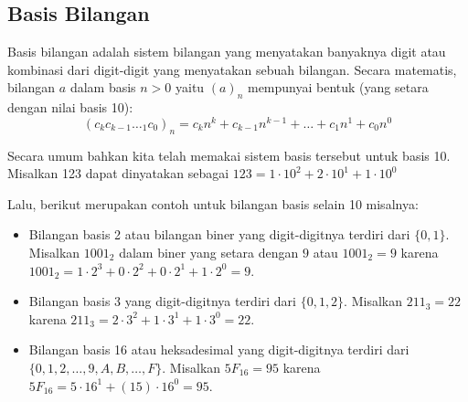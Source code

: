 \subsection{Basis Bilangan}
Basis bilangan adalah sistem bilangan yang menyatakan banyaknya digit atau kombinasi dari digit-digit yang menyatakan sebuah bilangan. Secara matematis, bilangan $a$ dalam basis $n > 0$ yaitu $(a)_n$ mempunyai bentuk (yang setara dengan nilai basis 10):
$$(c_kc_{k-1}\dotsc_1c_0)_n = c_{k}n^k + c_{k-1}n^{k-1}+\dots+c_1n^{1}+c_0n^{0}$$

Secara umum bahkan kita telah memakai sistem basis tersebut untuk basis 10. Misalkan 123 dapat dinyatakan sebagai $123 = 1\cdot 10^2 + 2\cdot 10^1 + 1\cdot 10^0$

Lalu, berikut merupakan contoh untuk bilangan basis selain 10 misalnya: 
\begin{itemize}
    \item Bilangan basis 2 atau bilangan biner yang digit-digitnya terdiri dari $\{0,1\}$. Misalkan $1001_2$ dalam biner yang setara dengan $9$ atau $1001_2 = 9$ karena $1001_2 = 1\cdot 2^3+0\cdot 2^2+0\cdot 2^1+1\cdot 2^0 = 9$. 
    \item Bilangan basis 3 yang digit-digitnya terdiri dari $\{0,1,2\}$. Misalkan $211_3 = 22$ karena $211_3 = 2\cdot 3^2+ 1\cdot 3^1+ 1\cdot 3^0 = 22$.
    \item Bilangan basis 16 atau heksadesimal yang digit-digitnya terdiri dari $\{0,1,2,\dots,9,A,B,\dots,F\}$. Misalkan $5F_{16} = 95$ karena $5F_{16} = 5 \cdot 16^1 + (15)\cdot 16^0 = 95$.
\end{itemize}

